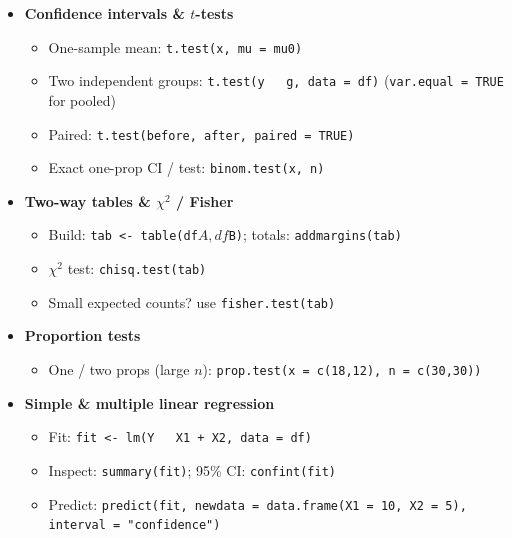 \documentclass[12pt]{book}
\begin{document}
\begin{itemize}
\item \textbf{Confidence intervals \& $t$-tests}
  \begin{itemize}
    \item One-sample mean: \texttt{t.test(x, mu = mu0)}
    \item Two independent groups: \texttt{t.test(y ~ g, data = df)}  
          (\texttt{var.equal = TRUE} for pooled)
    \item Paired: \texttt{t.test(before, after, paired = TRUE)}
    \item Exact one-prop CI / test: \texttt{binom.test(x, n)}
  \end{itemize}

\item \textbf{Two-way tables \& $\chi^2$ / Fisher}
  \begin{itemize}
    \item Build: \texttt{tab <- table(df$A, df$B)}; totals: \texttt{addmargins(tab)}
    \item $\chi^2$ test: \texttt{chisq.test(tab)}
    \item Small expected counts? use \texttt{fisher.test(tab)}
  \end{itemize}
\item \textbf{Proportion tests}
  \begin{itemize}
    \item One / two props (large $n$): \texttt{prop.test(x = c(18,12), n = c(30,30))}
  \end{itemize}

\item \textbf{Simple \& multiple linear regression}
  \begin{itemize}
    \item Fit: \texttt{fit <- lm(Y ~ X1 + X2, data = df)}
    \item Inspect: \texttt{summary(fit)}; 95\% CI: \texttt{confint(fit)}
    \item Predict: \texttt{predict(fit, newdata = data.frame(X1 = 10, X2 = 5),
          interval = "confidence")}
  \end{itemize}


\end{itemize}
\end{document}
